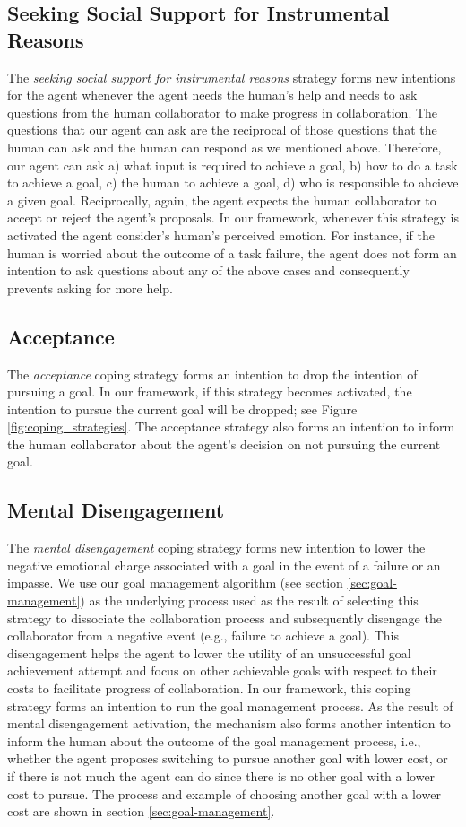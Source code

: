 \documentclass[12pt]{report}
\begin{document}
\subsection{Seeking Social Support for Instrumental Reasons}
The \textit{seeking social support for instrumental reasons} strategy forms new
intentions for the agent whenever the agent needs the human's help and needs to
ask questions from the human collaborator to make progress in collaboration. The
questions that our agent can ask are the reciprocal of those questions that the
human can ask and the human can respond as we mentioned above. Therefore, our
agent can ask a) what input is required to achieve a goal, b) how to do a task
to achieve a goal, c) the human to achieve a goal, d) who is responsible to
ahcieve a given goal. Reciprocally, again, the agent expects the human
collaborator to accept or reject the agent's proposals. In our framework,
whenever this strategy is activated the agent consider's human's perceived
emotion. For instance, if the human is worried about the outcome of a task
failure, the agent does not form an intention to ask questions about any of the
above cases and consequently prevents asking for more help.

\subsection{Acceptance}
The \textit{acceptance} coping strategy forms an intention to drop the
intention of pursuing a goal. In our framework, if this strategy becomes
activated, the intention to pursue the current goal will be dropped; see Figure
\ref{fig:coping_strategies}. The acceptance strategy also forms an intention to
inform the human collaborator about the agent's decision on not pursuing the
current goal.

\subsection{Mental Disengagement}
The \textit{mental disengagement} coping strategy forms new intention to lower
the negative emotional charge associated with a goal in the event of a failure
or an impasse. We use our goal management algorithm (see section
\ref{sec:goal-management}) as the underlying process used as the result of
selecting this strategy to dissociate the collaboration process and subsequently
disengage the collaborator from a negative event (e.g., failure to achieve a
goal). This disengagement helps the agent to lower the utility of an
unsuccessful goal achievement attempt and focus on other achievable goals with
respect to their costs to facilitate progress of collaboration. In our
framework, this coping strategy forms an intention to run the goal management
process. As the result of mental disengagement activation, the mechanism also
forms another intention to inform the human about the outcome of the goal
management process, i.e., whether the agent proposes switching to pursue another
goal with lower cost, or if there is not much the agent can do since there is no
other goal with a lower cost to pursue. The process and example of choosing
another goal with a lower cost are shown in section \ref{sec:goal-management}.
\end{document}

